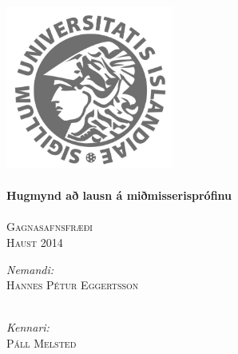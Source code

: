 \documentclass{article}
\begin{document}
\begin{titlepage}
\begin{center}

\textsc{}\\[2cm] 
\includegraphics[width=5.5cm]{../img/Haskoli_Islands_rett.jpg}\\[0.5cm]
\HRule \\[0.6cm]
{ \huge \bfseries Hugmynd að lausn á miðmisserisprófinu}\\[0.2cm]
\HRule \\[0.4cm]

\textsc{\normalsize Gagnasafnsfræði} \\
\textsc{Haust 2014} \\[1.5cm]

\begin{minipage}{0.45\textwidth}
\begin{flushleft} \large
\textit{Nemandi:}\\
\textsc{Hannes Pétur Eggertsson} \\
\textsc{ } \\
\end{flushleft}
\end{minipage}
\begin{minipage}{0.45\textwidth}
\begin{flushright} \large
\textit{Kennari:} \\
\textsc{Páll Melsted}\\
\textsc{ }\\
\end{flushright}
\end{minipage}

\end{center}
\end{titlepage}


\end{document}
